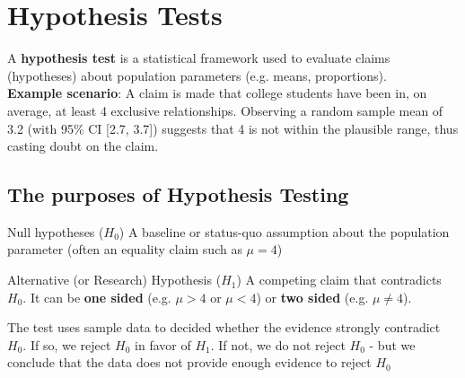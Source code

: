 \documentclass[10pt, total={6in, 8in}]{extarticle}
\begin{document}
\section{Hypothesis Tests}
A \textbf{hypothesis test} is a statistical framework used to evaluate claims (hypotheses) about population parameters (e.g. means, proportions). \\[2ex]
\textbf{Example scenario}: A claim is made that college students have been in, on average, at least 4 exclusive relationships. Observing a random sample mean of 3.2 (with 95\% CI [2.7, 3.7]) suggests that 4 is not within the plausible range, thus casting doubt on the claim.
\subsection{The purposes of Hypothesis Testing}
\begin{definitionbox}{Null hypotheses ($H_0$)}{}
    A baseline or status-quo assumption about the population parameter (often an equality claim such as $\mu = 4$)
\end{definitionbox}
\begin{definitionbox}{Alternative (or Research) Hypothesis ($H_1$)}{}
    A competing claim that contradicts $H_0$. It can be \textbf{one sided} (e.g. $\mu > 4$ or $\mu < 4$) or \textbf{two sided} (e.g. $\mu \neq 4$).
\end{definitionbox}
\noindent The test uses sample data to decided whether the evidence strongly contradict $H_0$. If so, we reject $H_0$ in favor of $H_1$. If not, we do not reject $H_0$ - but we conclude that  the data does not provide enough evidence to reject $H_0$
\end{document}
